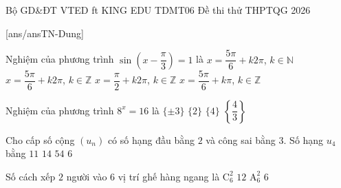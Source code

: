 \def\linkdethi{} %
\anmaQR
\def\toanlop{12}
\def\thoigian{90}
\def\namhoc{2025 - 2026}
\begin{dethi}
	{Bộ GD\&ĐT}
	{VTED ft KING EDU}
	{TDMT06}
	{Đề thi thử THPTQG 2026}
\end{dethi}
\caulc
{}[ans/ansTN-Dung]
\begin{ex}%
	Nghiệm của phương trình $\sin\left(x-\dfrac{\pi}{3}\right)=1$ là
	\choice
	{$x=\dfrac{5\pi}{6}+k2\pi$, $k \in \mathbb{N}$}
	{\True $x=\dfrac{5\pi}{6}+k2\pi$, $k \in \mathbb{Z}$}
	{$x=\dfrac{\pi}{2}+k2\pi$, $k \in \mathbb{Z}$}
	{$x=\dfrac{5\pi}{6}+k\pi$, $k \in \mathbb{Z}$}
\end{ex}

\begin{ex}%
	Nghiệm của phương trình $8^x = 16$ là
	\choice
	{$\{\pm3\}$}
	{$\{2\}$}
	{$\{4\}$}
	{\True $\left\lbrace\dfrac{4}{3}\right\rbrace$}
\end{ex}

\begin{ex}%
	Cho cấp số cộng $(u_n)$ có số hạng đầu bằng $2$ và công sai bằng $3$. Số hạng $u_4$ bằng
	\choice
	{\True $11$}
	{$14$}
	{$54$}
	{$6$}
\end{ex}

\begin{ex}%
	Số cách xếp $2$ người vào $6$ vị trí ghế hàng ngang là
	\choice
	{$\mathrm{C}_6^2$}
	{$12$}
	{\True$\mathrm{A}_6^2$}
	{$6$}
\end{ex}

